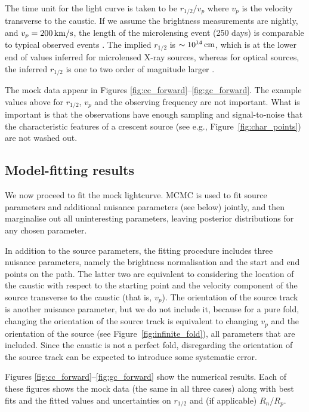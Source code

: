 \documentclass[usenatbib]{mn2e}
\begin{document}
The time unit for the light curve is taken to be $r_{1/2}/v_p$
where $v_p$ is the velocity transverse to the caustic.  If we
assume the brightness measurements are nightly, and
$v_p=\rm200\,km/s$, the length of the microlensing event (250
days) is comparable to typical observed events \cite[see
  e.g.,][]{2015ApJ...814L..26M}. The implied $r_{1/2}$ is
$\sim10^{14}\rm\,cm$, which is at the lower end of values inferred for
microlensed X-ray sources, whereas for optical sources, the inferred
$r_{1/2}$ is one to two order of magnitude larger \citep[see, e.g.,
  Figure~8 of][]{0004-637X-769-1-53}.  

The mock data appear in Figures
\ref{fig:cc_forward}--\ref{fig:gc_forward}.  The example values
above for $r_{1/2}$, $v_p$ and the observing frequency are not
important.  What is important is that the observations have enough
sampling and signal-to-noise that the characteristic features of a
crescent source (see e.g., Figure~\ref{fig:char_points}) are not
washed out.


\subsection{Model-fitting results}

We now proceed to fit the mock lightcurve.  MCMC is used to fit source
parameters and additional nuisance parameters (see below) jointly, and
then marginalise out all uninteresting parameters, leaving posterior
distributions for any chosen parameter.

In addition to the source parameters, the fitting procedure includes
three nuisance parameters, namely the brightness normalisation and the
start and end points on the path.  The latter two are equivalent to
considering the location of the caustic with respect to the starting
point and the velocity component of the source transverse to the
caustic (that is, $v_p$).  The orientation of the source track is
another nuisance parameter, but we do not include it, because for a
pure fold, changing the orientation of the source track is equivalent
to changing $v_p$ and the orientation of the source (see
Figure~\ref{fig:infinite_fold}), all parameters that are included.
Since the caustic is not a perfect fold, disregarding the orientation
of the source track can be expected to introduce some systematic
error.

Figures \ref{fig:cc_forward}--\ref{fig:gc_forward} show the numerical
results.  Each of these figures shows the mock data (the same in all
three cases) along with best fits and the fitted values and
uncertainties on $r_{1/2}$ and (if applicable) $R_n/R_p$.
\end{document}
